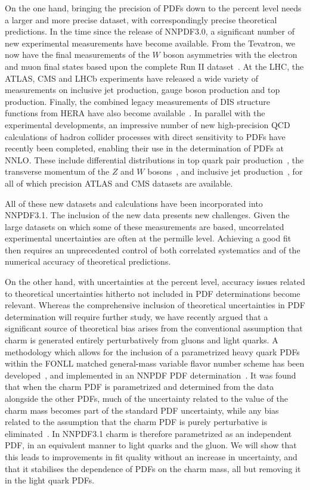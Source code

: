 On the one hand, bringing the precision of PDFs down to the percent
level needs  a larger and more precise dataset, with correspondingly 
precise theoretical predictions. In the time since the release of NNPDF3.0, a significant 
number of new experimental measurements have become available.
From the Tevatron, we now have the final measurements of the 
$W$ boson asymmetries with the electron and muon final states 
based upon the complete
Run II dataset~\cite{Abazov:2013rja,D0:2014kma}. At the LHC, 
the ATLAS, CMS and LHCb experiments have released a wide variety
of measurements on inclusive jet production, gauge boson production and 
top production. Finally, the combined legacy measurements of DIS 
structure functions from HERA have also become available~\cite{Abramowicz:2015mha}.
In parallel with the experimental developments, an impressive number of new high-precision 
QCD calculations of hadron collider processes with direct sensitivity to PDFs have
recently been completed, enabling their use in the determination of PDFs 
at NNLO. These include differential distributions in top quark pair
production~\cite{Czakon:2015owf,Czakon:2016dgf}, the transverse 
momentum of the $Z$ and $W$ bosons~\cite{Boughezal:2015dva,Ridder:2015dxa},
and inclusive jet production~\cite{Currie:2013dwa,Currie:2016bfm}, for all
of which precision ATLAS and CMS datasets are available.

All of these new datasets and calculations have been incorporated into
NNPDF3.1. The inclusion of the new data presents new challenges. Given
the large datasets on which some of these measurements are based,
uncorrelated experimental uncertainties are often at the permille
level. Achieving a good fit then requires an unprecedented control of
both correlated systematics and of the numerical accuracy of
theoretical predictions. 

On the other hand, with uncertainties at the percent level, accuracy
issues related to theoretical uncertainties hitherto not included
in PDF determinations become relevant. Whereas the comprehensive inclusion of theoretical
uncertainties in PDF determination will require further study, we
have recently argued that a significant 
source of theoretical bias arises from the conventional assumption 
that charm is generated entirely perturbatively from gluons and light quarks. 
A methodology which allows for the inclusion
of a parametrized 
heavy quark PDFs within the FONLL matched general-mass variable
flavor number scheme has been developed~\cite{Ball:2015tna,Ball:2015dpa}, and 
implemented in an NNPDF PDF determination~\cite{Ball:2016neh}.
It was found that when the charm PDF is parametrized and determined
from the data  alongside the other PDFs, 
much of the uncertainty related to the value of the charm mass becomes part of
the standard PDF uncertainty, while any bias related to the assumption 
that the charm PDF is purely perturbative is eliminated~\cite{Ball:2016neh}.
In NNPDF3.1 charm is therefore parametrized as an independent PDF, 
in an equivalent manner to light quarks and the gluon. 
We will show that this leads to improvements in fit quality without an increase
in uncertainty, and that it stabilises the dependence of PDFs on the charm mass, 
all but removing it in the light quark PDFs. 


